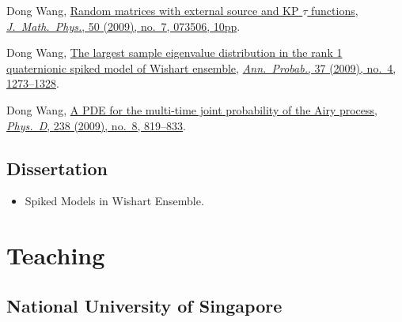 \begin{etaremune}
\item Dong Wang,
  \href{http://arxiv.org/abs/0810.0280}{Random matrices with external source and KP $\tau$ functions}, \href{https://doi.org/10.1063/1.3167802}{\textit{J.\ Math.\ Phys.}, 50 (2009), no.\ 7, 073506, 10pp}.
\item Dong Wang,
 \href{http://arxiv.org/abs/0711.2722}{The largest sample eigenvalue distribution in the rank 1 quaternionic spiked model of Wishart ensemble}, \href{https://doi.org/10.1214/08-AOP432}{\textit{Ann.\ Probab.}, 37 (2009), no.\ 4, 1273--1328}.
\item Dong Wang,
  \href{http://arxiv.org/abs/0711.3797}{A PDE for the multi-time joint probability of the Airy process}, \href{https://doi.org/10.1016/j.physd.2009.02.007}{\textit{Phys.\ D}, 238 (2009), no.\ 8, 819--833}.
\end{etaremune}

\subsection*{Dissertation }
\begin{itemize}
\item
  Spiked Models in Wishart Ensemble.
\end{itemize}

\section*{Teaching }

\subsection*{National University of Singapore }

